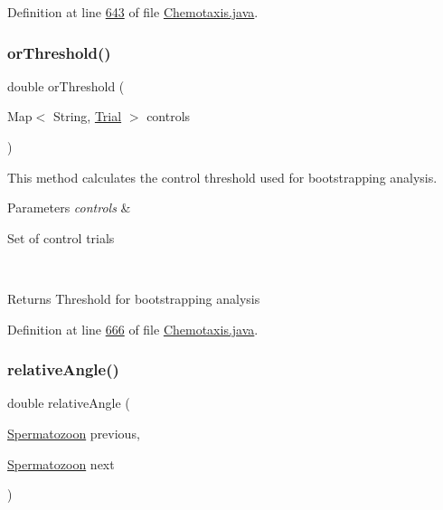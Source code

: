 Definition at line \hyperlink{_chemotaxis_8java_source_l00643}{643} of file \hyperlink{_chemotaxis_8java_source}{Chemotaxis.\+java}.

\hypertarget{classanalysis_1_1_chemotaxis_a8ee54f019a9258760e20482e3cd6b851}{}\label{classanalysis_1_1_chemotaxis_a8ee54f019a9258760e20482e3cd6b851} 
\subsubsection{\texorpdfstring{or\+Threshold()}{orThreshold()}}
{\footnotesize\ttfamily double or\+Threshold (\begin{DoxyParamCaption}\item[{Map$<$ String, \hyperlink{classdata_1_1_trial}{Trial} $>$}]{controls }\end{DoxyParamCaption})\hspace{0.3cm}{\ttfamily [private]}}

This method calculates the control threshold used for bootstrapping analysis.


\begin{DoxyParams}{Parameters}
{\em controls} & 
\begin{DoxyItemize}
\item Set of control trials 
\end{DoxyItemize}\\
\hline
\end{DoxyParams}
\begin{DoxyReturn}{Returns}
Threshold for bootstrapping analysis 
\end{DoxyReturn}


Definition at line \hyperlink{_chemotaxis_8java_source_l00666}{666} of file \hyperlink{_chemotaxis_8java_source}{Chemotaxis.\+java}.

\hypertarget{classanalysis_1_1_chemotaxis_ab23f946e0f1055d348e975e3058f323d}{}\label{classanalysis_1_1_chemotaxis_ab23f946e0f1055d348e975e3058f323d} 
\subsubsection{\texorpdfstring{relative\+Angle()}{relativeAngle()}}
{\footnotesize\ttfamily double relative\+Angle (\begin{DoxyParamCaption}\item[{\hyperlink{classdata_1_1_spermatozoon}{Spermatozoon}}]{previous,  }\item[{\hyperlink{classdata_1_1_spermatozoon}{Spermatozoon}}]{next }\end{DoxyParamCaption})\hspace{0.3cm}{\ttfamily [private]}}

